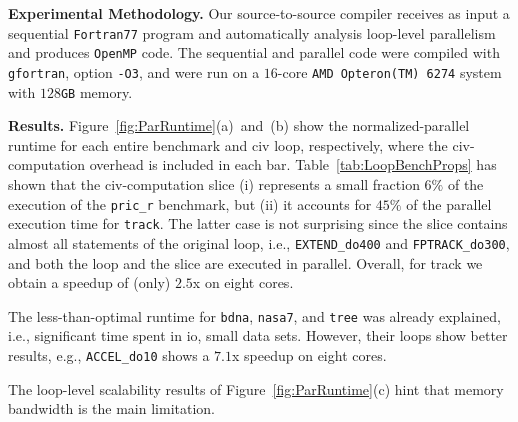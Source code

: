 \documentclass[10pt,nocopyrightspace]{sigplanconf}
\begin{document}


{\bf Experimental Methodology.} Our source-to-source compiler receives as
input a sequential {\tt Fortran77} program and automatically analysis loop-level 
parallelism and produces {\tt OpenMP} code.  The sequential and parallel 
code were compiled with {\tt gfortran}, option {\tt -O3}, and were run on 
a $16$-core {\tt AMD Opteron(TM) 6274} system with $128${\tt GB} memory. 
%

\enlargethispage{\baselineskip}

\vspace{1ex}

{\bf Results.} Figure~\ref{fig:ParRuntime}(a)~and~(b) show
the normalized-parallel runtime for each entire benchmark 
and {\sc civ} loop, respectively, where the {\sc civ}-computation
overhead is included in each bar.
%
Table~\ref{tab:LoopBenchProps} has shown that the {\sc civ}-computation slice 
(i) represents a small fraction $6\%$ of the execution of the 
{\tt pric\_r} benchmark,
but (ii) it accounts for $45\%$ of the parallel execution time for {\tt track}.
The latter case is not surprising since the slice contains almost all statements 
of the original loop, i.e., {\tt EXTEND\_do400} and {\tt FPTRACK\_do300}, 
and both the loop and the slice are executed in parallel.    
Overall, for track we obtain a speedup of (only) $2.5$x on eight cores.


The less-than-optimal runtime for {\tt bdna}, {\tt nasa7}, and 
{\tt tree} was already explained, i.e., significant time spent in {\sc io},
small data sets. However, their loops show better results,
e.g., {\tt ACCEL\_do10} shows a  $7.1$x speedup on eight cores. %

The loop-level scalability results of Figure~\ref{fig:ParRuntime}(c) 
hint that memory bandwidth is the main limitation. 
\end{document}
